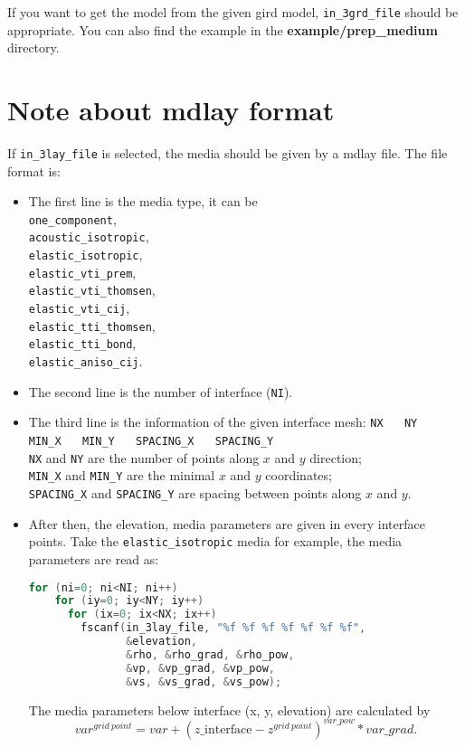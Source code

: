 If you want to get the model from the given gird model, \texttt{in\_3grd\_file} should be appropriate.
You can also find the example in the \textbf{example/prep\_medium} directory.

\section{Note about mdlay format} \label{mdlay}

If \texttt{in\_3lay\_file} is selected, the media should be given by a mdlay file. The file format is:
\begin{itemize}
  \item The first line is the media type, it can be \\
  \texttt{one\_component}, \\ 
  \texttt{acoustic\_isotropic}, \\
  \texttt{elastic\_isotropic}, \\
  \texttt{elastic\_vti\_prem}, \\
  \texttt{elastic\_vti\_thomsen}, \\ 
  \texttt{elastic\_vti\_cij}, \\
  \texttt{elastic\_tti\_thomsen}, \\ 
  \texttt{elastic\_tti\_bond}, \\
  \texttt{elastic\_aniso\_cij}.  

  \item The second line is the number of interface (\texttt{NI}).

  \item {The third line is the information of the given interface mesh:
  \texttt{NX} ~~ \texttt{NY} ~~ \texttt{MIN\_X} ~~ \texttt{MIN\_Y} ~~ \texttt{SPACING\_X} ~~ \texttt{SPACING\_Y} \\
  \texttt{NX} and \texttt{NY} are the number of points along $x$ and $y$ direction;\\
  \texttt{MIN\_X} and \texttt{MIN\_Y} are the minimal $x$ and $y$ coordinates;\\
  \texttt{SPACING\_X} and \texttt{SPACING\_Y} are spacing between points along $x$ and $y$.
 }

 \item {
  After then, the elevation, media parameters are given in every interface points. Take the \texttt{elastic\_isotropic} media for example, the media parameters are read as:
  \begin{lstlisting}[language = C]
  for (ni=0; ni<NI; ni++)
    for (iy=0; iy<NY; iy++) 
      for (ix=0; ix<NX; ix++) 
        fscanf(in_3lay_file, "%f %f %f %f %f %f %f", 
               &elevation,
               &rho, &rho_grad, &rho_pow,
               &vp, &vp_grad, &vp_pow,
               &vs, &vs_grad, &vs_pow);
  \end{lstlisting}
 }

 The media parameters below interface (x, y, elevation) are calculated by
 \begin{equation*}
        var^{grid~point} = var + (z\text{\_interface}-z^{grid~point})^{var\_pow} * var\_grad.
 \end{equation*} 
\end{itemize}
